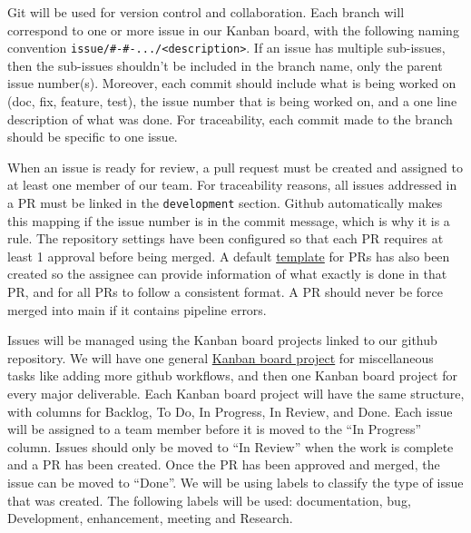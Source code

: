 \documentclass{article}
\begin{document}
Git will be used for version control and collaboration. Each branch will
correspond to one or more issue in our Kanban board, with the following naming
convention \texttt{issue/\#<issue-number1>-\#<issue-number2>-.../<description>}.
If an issue has multiple sub-issues, then the sub-issues shouldn't be included
in the branch name, only the parent issue number(s). Moreover, each commit
should include what is being worked on (doc, fix, feature, test), the issue 
number that is being worked on, and a one line description of what was done.
For traceability, each commit made to the branch should be specific to one
issue.

When an issue is ready for review, a pull request must be created and assigned
to at least one member of our team. For traceability reasons, all issues
addressed in a PR must be linked in the \texttt{development} section. Github
automatically makes this mapping if the issue number is in the commit message,
which is why it is a rule. The repository settings have been configured so that
each PR requires at least 1 approval before being merged. A default
\href{https://github.com/Team6-SixSense/audio360/blob/main/.github/pull_request_template.md}{template}
for PRs has also been created so the assignee can provide information of what
exactly is done in that PR, and for all PRs to follow a consistent format. A PR
should never be force merged into main if it contains pipeline errors.

Issues will be managed using the Kanban board projects linked to our github
repository. We will have one general 
\href{https://github.com/orgs/Team6-SixSense/projects/1}{Kanban board project} 
for miscellaneous
tasks like adding more github workflows, and then one Kanban board project for
every major deliverable. Each Kanban board project will have the same structure,
with columns for Backlog, To Do, In Progress, In Review, and Done. Each issue
will be assigned to a team member before it is moved to the ``In Progress''
column. Issues should only be moved to ``In Review'' when the work is complete
and a PR has been created. Once the PR has been approved and merged, the issue
can be moved to ``Done''. We will be using labels to classify the type of issue
that was created. The following labels will be used: documentation, bug,
Development, enhancement, meeting and Research.
\end{document}

